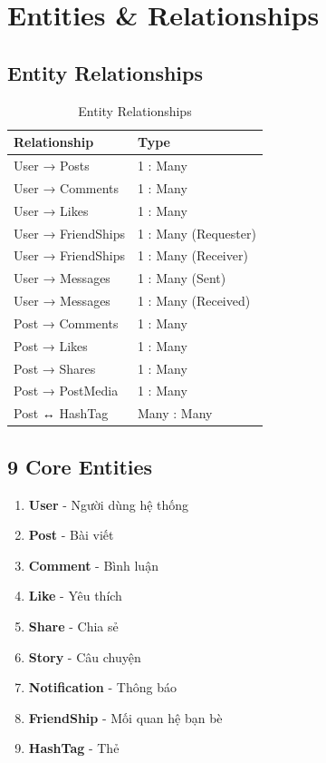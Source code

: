 \documentclass[12pt,a4paper]{report}
\begin{document}
\section{Entities \& Relationships}

\subsection{Entity Relationships}
\begin{table}[h]
    \centering
    \begin{tabular}{|l|l|}
        \hline
        \rowcolor{lightblue}
        \textbf{Relationship} & \textbf{Type} \\
        \hline
        User → Posts & 1 : Many \\
        User → Comments & 1 : Many \\
        User → Likes & 1 : Many \\
        User → FriendShips & 1 : Many (Requester) \\
        User → FriendShips & 1 : Many (Receiver) \\
        User → Messages & 1 : Many (Sent) \\
        User → Messages & 1 : Many (Received) \\
        Post → Comments & 1 : Many \\
        Post → Likes & 1 : Many \\
        Post → Shares & 1 : Many \\
        Post → PostMedia & 1 : Many \\
        Post ↔ HashTag & Many : Many \\
        \hline
    \end{tabular}
    \caption{Entity Relationships}
\end{table}

\subsection{9 Core Entities}
\begin{enumerate}
    \item \textbf{User} - Người dùng hệ thống
    \item \textbf{Post} - Bài viết
    \item \textbf{Comment} - Bình luận
    \item \textbf{Like} - Yêu thích
    \item \textbf{Share} - Chia sẻ
    \item \textbf{Story} - Câu chuyện
    \item \textbf{Notification} - Thông báo
    \item \textbf{FriendShip} - Mối quan hệ bạn bè
    \item \textbf{HashTag} - Thẻ
\end{enumerate}
\end{document}
